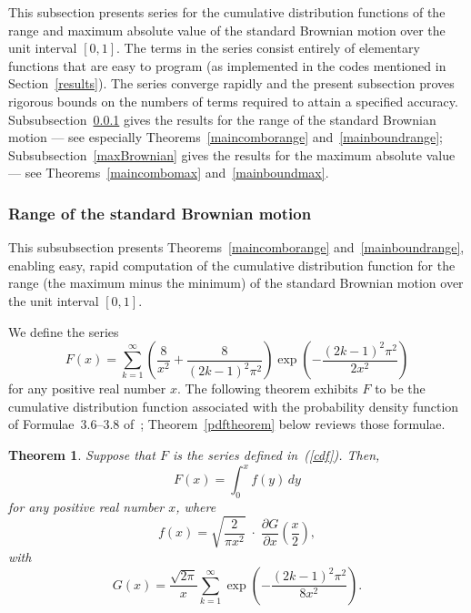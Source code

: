 \documentclass[12pt]{article}
\newtheorem{theorem}{Theorem}[]
\begin{document}
This subsection presents series for the cumulative distribution functions
of the range and maximum absolute value of the standard Brownian motion
over the unit interval $[0, 1]$.
The terms in the series consist entirely of elementary functions that are easy
to program (as implemented in the codes mentioned in Section~\ref{results}).
The series converge rapidly and the present subsection proves rigorous bounds
on the numbers of terms required to attain a specified accuracy.
Subsubsection~\ref{rangeBrownian} gives the results
for the range of the standard Brownian motion ---
see especially Theorems~\ref{maincomborange} and~\ref{mainboundrange};
Subsubsection~\ref{maxBrownian} gives the results
for the maximum absolute value ---
see Theorems~\ref{maincombomax} and~\ref{mainboundmax}.



\subsubsection{Range of the standard Brownian motion}
\label{rangeBrownian}

This subsubsection presents Theorems~\ref{maincomborange}
and~\ref{mainboundrange}, enabling easy, rapid computation
of the cumulative distribution function for the range
(the maximum minus the minimum) of the standard Brownian motion
over the unit interval $[0, 1]$.

We define the series
%
\begin{equation}
\label{cdf}
F(x) = \sum_{k=1}^\infty
\left( \frac{8}{x^2} + \frac{8}{(2k-1)^2 \pi^2} \right)
\exp\left(-\frac{(2k-1)^2 \pi^2}{2x^2}\right)
\end{equation}
%
for any positive real number $x$.
The following theorem exhibits $F$ to be the cumulative distribution function
associated with the probability density function
of Formulae~3.6--3.8 of~\citet{feller};
Theorem~\ref{pdftheorem} below reviews those formulae.

\begin{theorem}
\label{cdftheorem}
Suppose that $F$ is the series defined in~(\ref{cdf}).
Then,
%
\begin{equation}
F(x) = \int_0^x f(y) \, dy
\end{equation}
%
for any positive real number $x$,
%
where
%
\begin{equation}
\label{pdf}
f(x) = \sqrt{\frac{2}{\pi x^2}} \;\cdot\;
\frac{\partial G}{\partial x}\left(\frac{x}{2}\right),
\end{equation}
%
with
%
\begin{equation}
\label{G}
G(x) = \frac{\sqrt{2\pi}}{x} \sum_{k=1}^\infty
\exp\left( -\frac{(2k-1)^2 \pi^2}{8x^2} \right).
\end{equation}
%
\end{theorem}
\end{document}

